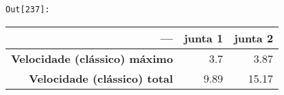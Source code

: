 \documentclass[11pt]{article}
\begin{document}
\texttt{\color{outcolor}Out[{\color{outcolor}237}]:}
    
    \begin{longtable}[]{@{}rrr@{}}
\toprule
--- & junta 1 & junta 2\tabularnewline
\midrule
\endhead
\textbf{Velocidade (clássico) máximo} & 3.7 & 3.87\tabularnewline
\textbf{Velocidade (clássico) total} & 9.89 & 15.17\tabularnewline
\bottomrule
\end{longtable}

    


    
    
    
    
\end{document}
